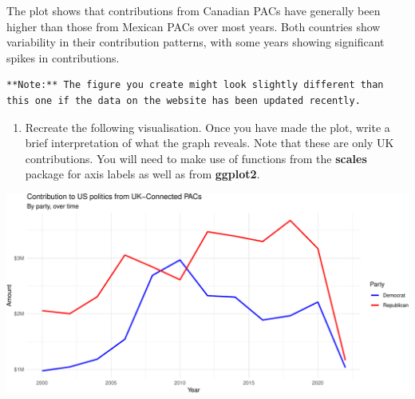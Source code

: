 \documentclass[
]{article}
\providecommand{\tightlist}{%
  \setlength{\itemsep}{0pt}\setlength{\parskip}{0pt}}
\begin{document}
The plot shows that contributions from Canadian PACs have generally been
higher than those from Mexican PACs over most years. Both countries show
variability in their contribution patterns, with some years showing
significant spikes in contributions.

\begin{verbatim}
**Note:** The figure you create might look slightly different than this one if the data on the website has been updated recently.
\end{verbatim}

\begin{enumerate}
\def\labelenumi{\arabic{enumi}.}
\setcounter{enumi}{3}
\tightlist
\item
  Recreate the following visualisation. Once you have made the plot,
  write a brief interpretation of what the graph reveals. Note that
  these are only UK contributions. You will need to make use of
  functions from the \textbf{scales} package for axis labels as well as
  from \textbf{ggplot2}.
\end{enumerate}

\includegraphics[width=0.8\linewidth]{hw-06-money-in-politics_files/figure-latex/unnamed-chunk-2-1}
\end{document}
